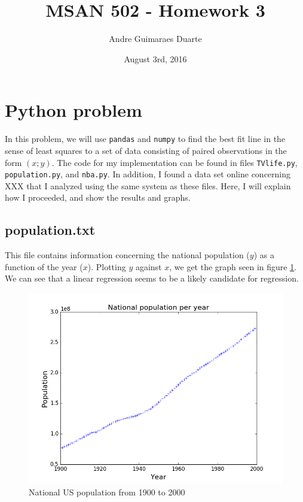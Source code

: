 \documentclass[]{article}
\title{MSAN 502 - Homework 3}
\author{Andre Guimaraes Duarte}
\date{August 3rd, 2016}
\begin{document}
\maketitle

\section*{Python problem}
In this problem, we will use \texttt{pandas} and \texttt{numpy} to find the best fit line in the sense of least squares to a set of data consisting of paired observations in the form $(x; y)$. The code for my implementation can be found in files \texttt{TVlife.py}, \texttt{population.py}, and \texttt{nba.py}. In addition, I found a data set online concerning XXX that I analyzed using the same system as these files. Here, I will explain how I proceeded, and show the results and graphs.

\subsection*{population.txt}
This file contains information concerning the national population ($y$) as a function of the year ($x$). Plotting $y$ against $x$, we get the graph seen in figure \ref{pop_plain}. We can see that a linear regression seems to be a likely candidate for regression.

\begin{figure}[h]
\centering
\includegraphics{pop_plain.png}
\caption{National US population from 1900 to 2000}
\label{pop_plain}
\end{figure}
\end{document}
